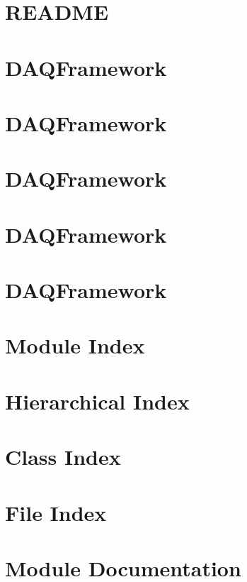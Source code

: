 \let\mypdfximage\pdfximage\def\pdfximage{\immediate\mypdfximage}\documentclass[twoside]{book}
\newcommand{\+}{\discretionary{\mbox{\scriptsize$\hookleftarrow$}}{}{}}
\begin{document}
\chapter{README}
\label{md_README}

\chapter{DAQFramework}
\label{md_src_Store_README}

\chapter{DAQFramework}
\label{md_src_ToolDAQChain_README}

\chapter{DAQFramework}
\label{md_tempinclude_README}

\chapter{DAQFramework}
\label{md_UserTools_README}

\chapter{DAQFramework}
\label{md_UserTools_template_README}

\chapter{Module Index}

\chapter{Hierarchical Index}

\chapter{Class Index}

\chapter{File Index}

\chapter{Module Documentation}







\end{document}
